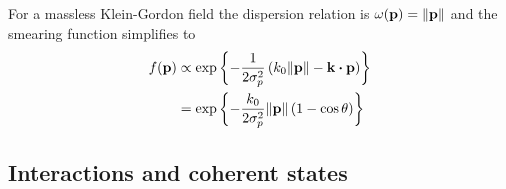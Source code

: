 For a massless Klein-Gordon field the dispersion relation is $\omega(\vb{p})=\norm{\vb{p}}$ and the smearing function simplifies to
\begin{equation}
	\begin{split}
		f(\vb{p})
		&\propto
		\exp\left\{
			-
			\frac{1}{2\sigma_p^2}
			\left(
				k_0
				\norm{\vb{p}}
				-
				\vb{k}\vdot\vb{p}
			\right)
		\right\}
		\\
		&=
		\exp\left\{
			-
			\frac{k_0}{2\sigma_p^2}
			\norm{\vb{p}}
			\left(
				1	
				-
				\cos\theta
			\right)
		\right\}
	\end{split}
\end{equation}

\subsection{Interactions and coherent states}

